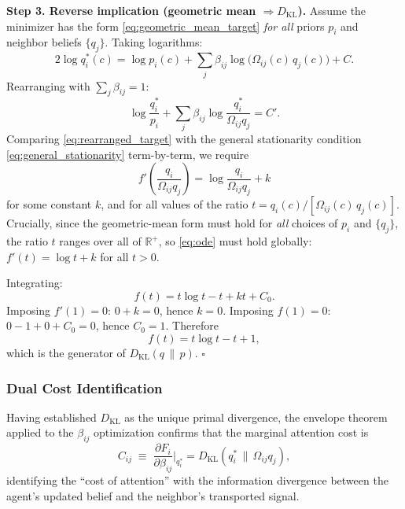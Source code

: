 \documentclass[twoside,11pt]{article}
\begin{document}
\textbf{Step 3.  Reverse implication (geometric mean $\Rightarrow D_{\mathrm{KL}}$).}
Assume the minimizer has the form \eqref{eq:geometric_mean_target} \emph{for all} priors $p_i$ and neighbor beliefs $\{q_j\}$.  Taking logarithms:
\begin{equation}
2\log q_i^*(c) = \log p_i(c) + \sum_j\beta_{ij}\log\bigl(\Omega_{ij}(c)\,q_j(c)\bigr) + C.
\label{eq:log_target}
\end{equation}
Rearranging with $\sum_j\beta_{ij}=1$:
\begin{equation}
\log\frac{q_i^*}{p_i} + \sum_j\beta_{ij}\log\frac{q_i^*}{\Omega_{ij}q_j} = C'.
\label{eq:rearranged_target}
\end{equation}
Comparing \eqref{eq:rearranged_target} with the general stationarity condition \eqref{eq:general_stationarity} term-by-term, we require
\begin{equation}
f'\!\!\left(\frac{q_i}{\Omega_{ij}q_j}\right) = \log\frac{q_i}{\Omega_{ij}q_j} + k
\label{eq:ode}
\end{equation}
for some constant $k$, and for all values of the ratio $t = q_i(c)/[\Omega_{ij}(c)\,q_j(c)]$.  Crucially, since the geometric-mean form must hold for \emph{all} choices of $p_i$ and $\{q_j\}$, the ratio $t$ ranges over all of $\mathbb{R}^+$, so \eqref{eq:ode} must hold globally: $f'(t)=\log t + k$ for all $t>0$.

Integrating:
\[
f(t) = t\log t - t + kt + C_0.
\]
Imposing $f'(1)=0$: $0 + k = 0$, hence $k=0$.  Imposing $f(1)=0$: $0 - 1 + 0 + C_0 = 0$, hence $C_0 = 1$.  Therefore
\[
f(t) = t\log t - t + 1,
\]
which is the generator of $D_{\mathrm{KL}}(q\,\|\,p)$. \hfill $\square$

\subsubsection{Dual Cost Identification}
Having established $D_{\mathrm{KL}}$ as the unique primal divergence, the envelope theorem applied to the $\beta_{ij}$ optimization confirms that the marginal attention cost is
\begin{equation}
C_{ij} \;\equiv\; \frac{\partial F_i}{\partial\beta_{ij}}\bigg|_{q_i^*}
= D_{\mathrm{KL}}(q_i^*\,\|\,\Omega_{ij}q_j),
\end{equation}
identifying the ``cost of attention'' with the information divergence between the agent's updated belief and the neighbor's transported signal.
\end{document}
